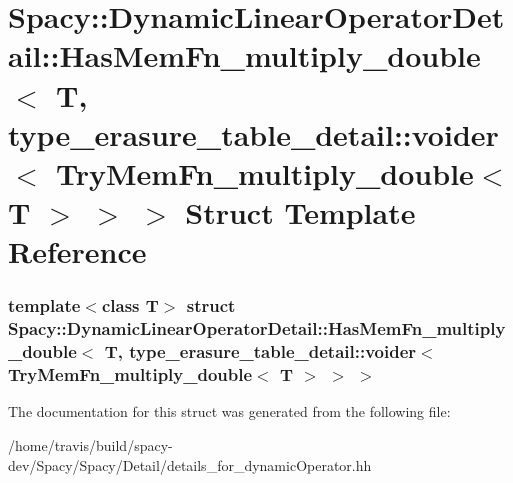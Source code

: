 \hypertarget{structSpacy_1_1DynamicLinearOperatorDetail_1_1HasMemFn__multiply__double_3_01T_00_01type__erasur5b78012d06059cb1e476cf724719e219}{\section{\-Spacy\-:\-:\-Dynamic\-Linear\-Operator\-Detail\-:\-:\-Has\-Mem\-Fn\-\_\-multiply\-\_\-double$<$ \-T, type\-\_\-erasure\-\_\-table\-\_\-detail\-:\-:voider$<$ \-Try\-Mem\-Fn\-\_\-multiply\-\_\-double$<$ \-T $>$ $>$ $>$ \-Struct \-Template \-Reference}
\label{structSpacy_1_1DynamicLinearOperatorDetail_1_1HasMemFn__multiply__double_3_01T_00_01type__erasur5b78012d06059cb1e476cf724719e219}
}
\subsubsection*{template$<$class T$>$ struct Spacy\-::\-Dynamic\-Linear\-Operator\-Detail\-::\-Has\-Mem\-Fn\-\_\-multiply\-\_\-double$<$ T, type\-\_\-erasure\-\_\-table\-\_\-detail\-::voider$<$ Try\-Mem\-Fn\-\_\-multiply\-\_\-double$<$ T $>$ $>$ $>$}



\-The documentation for this struct was generated from the following file\-:\begin{DoxyCompactItemize}
\item 
/home/travis/build/spacy-\/dev/\-Spacy/\-Spacy/\-Detail/details\-\_\-for\-\_\-dynamic\-Operator.\-hh\end{DoxyCompactItemize}
